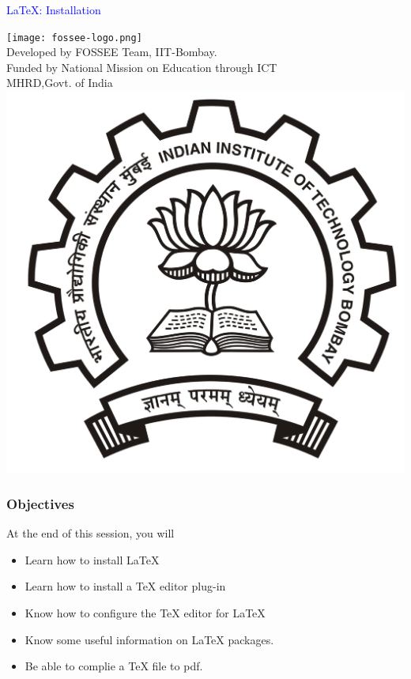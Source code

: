 \documentclass[14pt,compress]{beamer}
\begin{document}
\begin{frame}

\begin{center}
\vspace{12pt}
\textcolor{blue}{\huge {\LaTeX}: Installation}
\end{center}
\vspace{18pt}
\begin{center}
\vspace{10pt}
\texttt{[image: fossee-logo.png]}\\
\vspace{5pt}
\scriptsize Developed by FOSSEE Team, IIT-Bombay. \\ 
\scriptsize Funded by National Mission on Education through ICT\\
\scriptsize  MHRD,Govt. of India\\
\includegraphics[scale=0.15]{images/iitb-logo.jpg}\\
\end{center}
\end{frame}

\begin{frame}
  \frametitle{Objectives}
  At the end of this session, you will
  \begin{itemize}
  \item Learn how to install LaTeX
  \item Learn how to install a TeX editor plug-in
  \item Know how to configure the TeX editor for LaTeX
  \item Know some useful information on LaTeX packages.
  \item Be able to complie a TeX file to pdf.

  \end{itemize}
\end{frame}
\end{document}
